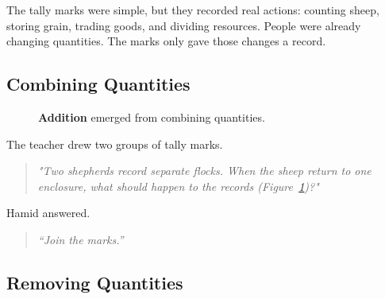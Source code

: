 \documentclass[11pt]{article}
\begin{document}
The tally marks were simple, but they recorded real actions: counting sheep, storing grain, trading goods, and dividing resources. People were already changing quantities. The marks only gave those changes a record.

\subsection*{Combining Quantities}

\begin{figure}[ht]
\centering


\caption{ \textbf{Addition} emerged from combining quantities.
}

\label{fig:additiontally}

\end{figure}

The teacher drew two groups of tally marks.
\begin{quote}
\emph{"Two shepherds record separate flocks. When the sheep return to one enclosure, what should happen to the records (Figure~\ref{fig:additiontally})?"}
\end{quote}
Hamid answered.
\begin{quote}
\emph{``Join the marks.''}
\end{quote}



\subsection*{Removing Quantities}
\end{document}
